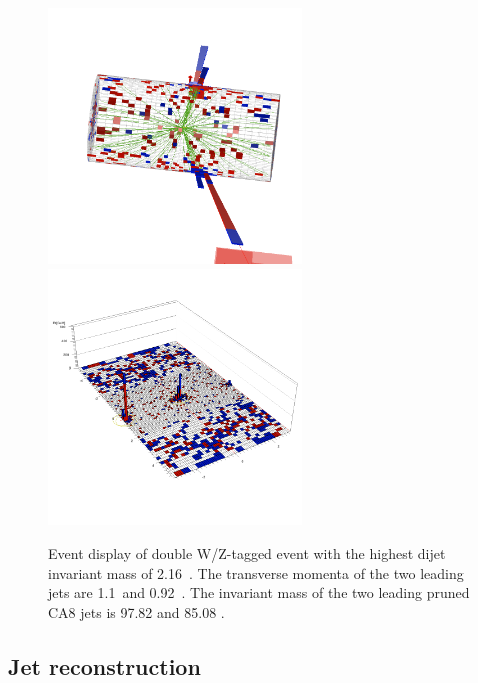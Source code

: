 \begin{figure}[!htbp]
\begin{center}
\includegraphics[width=0.6\textwidth,angle=0]{EXO-12-024/figs/event-display/highdoublemass/tower-white.png}
\includegraphics[width=0.6\textwidth,angle=0]{EXO-12-024/figs/event-display/highdoublemass/lego-white.png}
\end{center}
\caption{Event display of double W/Z-tagged event with the highest dijet invariant mass of 2.16~\TeVcc .
The transverse momenta of the two leading jets are 1.1~\TeVcc and 0.92~\TeVcc .
The invariant mass of the two leading pruned CA8 jets is 97.82 \GeVcc and 85.08 \GeVcc .
}
\label{fig:eventdisplay2}
\end{figure}


\subsection{Jet reconstruction}

\label{sec:reconstruction}


